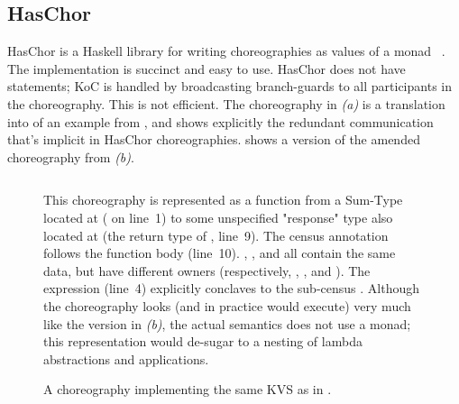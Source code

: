 \subsection{HasChor}\label{sec:haschor}
HasChor is a Haskell library for writing choreographies as values
of a monad ~\cite{shen-haschor}.
The implementation is succinct and easy to use.
HasChor does not have  statements;
KoC is handled by broadcasting branch-guards to all participants in the choreography.
This is not efficient.
The choreography in \emph{(a)}
is a translation into \MultiChor of an example from \cite{shen-haschor},
and shows explicitly the redundant communication that's implicit in HasChor choreographies.
 shows a \HLSCentral version of the amended choreography from \emph{(b)}.

\begin{figure}[tbhp]
    \begin{mdframed}
    \inputminted[xleftmargin=10pt,linenos,fontsize=\scriptsize]{bash}{figures/kvs_hls.txt}
  \begin{minipage}{0.95\linewidth}
    This choreography is represented as a function from a Sum-Type located at 
    ( on line~1)
    to some unspecified "response" type also located at 
    (the return type of , line~9).
    The census annotation follows the function body (line~10).
    , , and  all contain the same data,
    but have different owners (respectively, \inlinecode{[client]}, \inlinecode{[primary]}, and ).
    The  expression (line~4) explicitly conclaves to the sub-census .
    Although the choreography looks (and in practice would execute) very much like the \MultiChor version in \emph{(b)},
    the actual semantics does not use a monad;
    this representation would de-sugar to a nesting of lambda abstractions and applications.
  \end{minipage}
    \caption{A \HLSCentral choreography implementing the same KVS as in .}
    \label{fig:our-kvs}
    \end{mdframed}
\end{figure}


